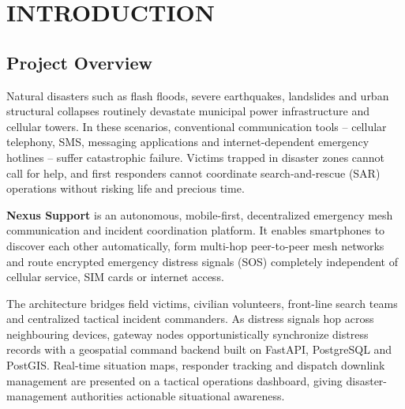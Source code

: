 \documentclass[12pt,a4paper]{report}
\begin{document}
\tableofcontents
\newpage
\listoffigures
\vspace{0.8cm}
\begingroup
\let\clearpage\relax
\let\cleardoublepage\relax
\listoftables
\endgroup
\newpage

\setcounter{page}{1}

\chapter{INTRODUCTION}

\section{Project Overview}
Natural disasters such as flash floods, severe earthquakes, landslides and urban structural collapses routinely devastate municipal power infrastructure and cellular towers. In these scenarios, conventional communication tools -- cellular telephony, SMS, messaging applications and internet-dependent emergency hotlines -- suffer catastrophic failure. Victims trapped in disaster zones cannot call for help, and first responders cannot coordinate search-and-rescue (SAR) operations without risking life and precious time.

\textbf{Nexus Support} is an autonomous, mobile-first, decentralized emergency mesh communication and incident coordination platform. It enables smartphones to discover each other automatically, form multi-hop peer-to-peer mesh networks and route encrypted emergency distress signals (SOS) completely independent of cellular service, SIM cards or internet access.

The architecture bridges field victims, civilian volunteers, front-line search teams and centralized tactical incident commanders. As distress signals hop across neighbouring devices, gateway nodes opportunistically synchronize distress records with a geospatial command backend built on FastAPI, PostgreSQL and PostGIS. Real-time situation maps, responder tracking and dispatch downlink management are presented on a tactical operations dashboard, giving disaster-management authorities actionable situational awareness.
\end{document}
